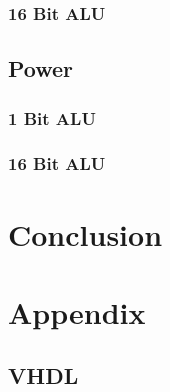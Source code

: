 \documentclass[11pt]{article}
\begin{document}
{		
		\subsubsection{16 Bit ALU}
	
	\subsection{Power}
		
		\subsubsection{1 Bit ALU}
		
		\subsubsection{16 Bit ALU}

\section{Conclusion}


\section{Appendix}

	\subsection{VHDL}
	
}
\end{document}
